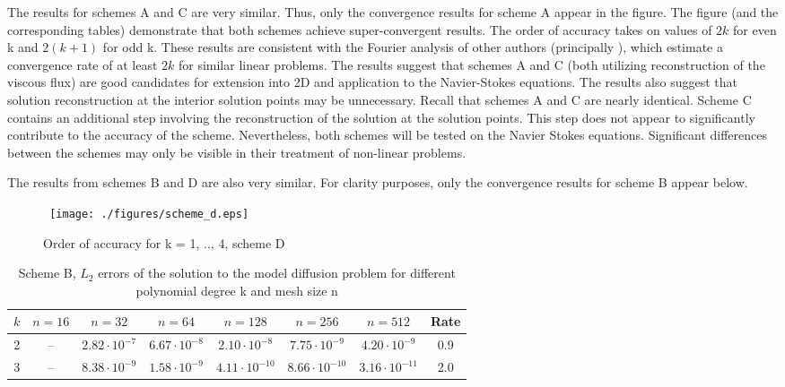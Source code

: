 \noindent The results for schemes A and C are very similar. Thus, only the convergence results for scheme A appear in the figure. The figure (and the corresponding tables) demonstrate that both schemes achieve super-convergent results. The order of accuracy takes on values of $2k$ for even k and $2(k+1)$ for odd k. These results are consistent with the Fourier analysis of other authors (principally \cite{Huynh09}), which estimate a convergence rate of at least $2k$ for similar linear problems. The results suggest that schemes A and C (both utilizing reconstruction of the viscous flux) are good candidates for extension into 2D and application to the Navier-Stokes equations. The results also suggest that solution reconstruction at the interior solution points may be unnecessary. Recall that schemes A and C are nearly identical. Scheme C contains an additional step involving the reconstruction of the solution at the solution points. This step does not appear to significantly contribute to the accuracy of the scheme. Nevertheless, both schemes will be tested on the Navier Stokes equations. Significant differences between the schemes may only be visible in their treatment of non-linear problems. 

\vspace{0.1in}
\noindent The results from schemes B and D are also very similar. For clarity purposes, only the convergence results for scheme B appear below.

\begin{figure} \tt
\centering
\texttt{[image: ./figures/scheme\_d.eps]} \\
\caption{Order of accuracy for k = 1, .., 4, scheme D}
\label{fig:a_scheme}
\end{figure}

\begin{table} 
\begin{center}
\begin{tabular}{ c | c  c  c  c  c  c | c }
	\hline
	$k$ & $n = 16$ & $n = 32$ & $n = 64$ & $n = 128$ & $n = 256$ & $n = 512$ & Rate \\
	\hline
	2 & -- & $2.82 \cdot 10^{-7}$ & $6.67 \cdot 10^{-8}$ & $2.10 \cdot 10^{-8} $ &  $7.75 \cdot 10^{-9}$  & $ 4.20 \cdot 10^{-9} $ & 0.9 \\
	3 & -- & $8.38 \cdot 10^{-9}$ & $1.58 \cdot 10^{-9}$ & $4.11 \cdot 10^{-10} $ &  $8.66 \cdot 10^{-10}$  & $ 3.16 \cdot 10^{-11} $ & 2.0\\
	\hline
\end{tabular}
\caption{Scheme B, $L_{2}$ errors of the solution to the model diffusion problem for different polynomial degree k and mesh size n}
\label{table:scheme_c}
\end{center}
\end{table}

